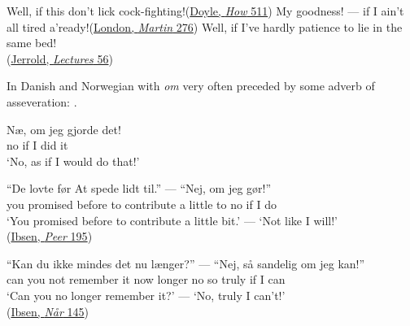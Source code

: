\ex
Well, if this don't lick cock-fighting!\hfill(\href{https://archive.org/details/TheStrandMagazineAnIllustratedMonthly/TheStrandMagazine1895aVol.IxJan-jun/page/n523/mode/2up?q=\%22if+this+don%27t+lick\%22&view=theater}{Doyle, \textit{How} 511}) 
\ex
My goodness! --- if I ain't all tired a'ready!\hfill(\href{https://archive.org/details/martineden00londiala/page/274/mode/2up?q=\%22My+goodness%21+%E2%80%94+if+I+ain%E2%80%99t+all+tired+a%E2%80%99ready%21\%22&view=theater}{London, \textit{Martin} 276})
\ex
Well, if I've hardly patience to lie in the same bed!\\\hfill(\href{https://archive.org/details/mrscaudlescurtai00jerruoft/page/74/mode/2up?q=\%22Well%2C+if+I%E2%80%99ve+hardly+patience+to+lie+in+the+same+bed%21\%22&view=theater}{Jerrold, \textit{Lectures} 56})
\z
\z

In Danish and Norwegian with \textit{om} very often preceded by some adverb of asseveration: .

\ea \label{ex:04-93}
\ea
\gll Næ, om jeg gjorde det!\\
 no if I did it\\
\glt `No, as if I would do that!'

\ex{}
\gll ``De lovte før At spede lidt til.'' --- ``Nej, om jeg gør!''\\
 you promised before to contribute {a little} to {} no if I do\\
\glt `You promised before to contribute a little bit.' --- `Not like I will!'\\
\hfill(\href{https://archive.org/details/peergyntetdrama00hagegoog/page/n213/mode/2up?q=\%22spede+lidt\%22&view=theater}{Ibsen, \textit{Peer} 195})

\ex{}
\gll ``Kan du ikke mindes det nu længer?'' --- ``Nej, så sandelig om jeg kan!''\\
 can you not remember it now longer {} no so truly if I can\\
\glt `Can you no longer remember it?' --- `No, truly I can't!'\\%
\hfill(\href{https://archive.org/details/nrviddevgner00ibsegoog/page/n158/mode/2up?q=\%22ikke+mindes\%22&view=theater}{Ibsen, \textit{Når} 145})

